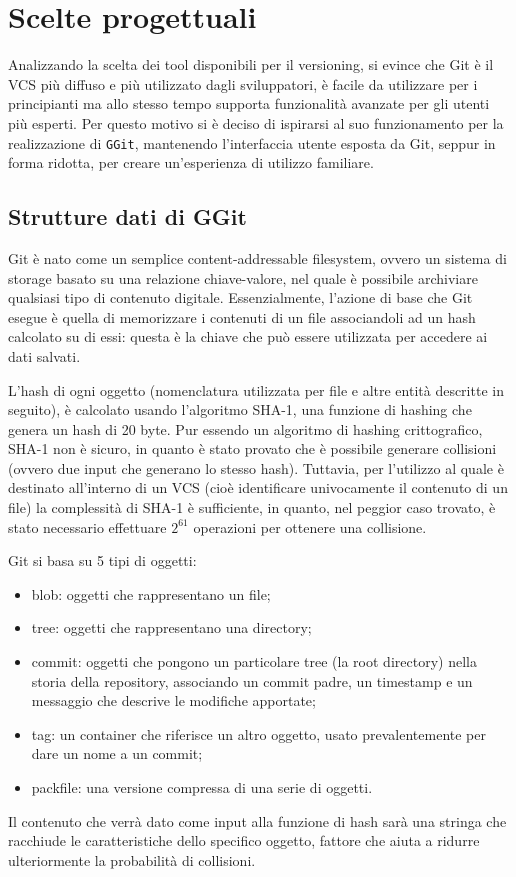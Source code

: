 \chapter{Scelte progettuali}
\label{chap:scelte_progettuali}
Analizzando la scelta dei tool disponibili per il versioning, si evince che Git è il VCS più diffuso e più utilizzato\cite{gitmostused} dagli sviluppatori, è facile da utilizzare per i principianti ma allo stesso tempo supporta funzionalità avanzate per gli utenti più esperti. Per questo motivo si è deciso di ispirarsi al suo funzionamento per la realizzazione di \texttt{GGit}, mantenendo l'interfaccia utente esposta da Git, seppur in forma ridotta, per creare un'esperienza di utilizzo familiare.
\section{Strutture dati di GGit}
\label{sec:strutture_dati}
Git è nato come un semplice content-addressable filesystem, ovvero un sistema di storage basato su una relazione chiave-valore, nel quale è possibile archiviare qualsiasi tipo di contenuto digitale. Essenzialmente, l'azione di base che Git esegue è quella di memorizzare i contenuti di un file associandoli ad un hash calcolato su di essi: questa è la chiave che può essere utilizzata per accedere ai dati salvati.

L'hash di ogni oggetto (nomenclatura utilizzata per file e altre entità descritte in seguito), è calcolato usando l'algoritmo SHA-1, una funzione di hashing che genera un hash di 20 byte.
Pur essendo un algoritmo di hashing crittografico, SHA-1 non è sicuro, in quanto è stato provato che è possibile generare collisioni\cite{sha1collision} (ovvero due input che generano lo stesso hash).
Tuttavia, per l'utilizzo al quale è destinato all'interno di un VCS (cioè identificare univocamente il contenuto di un file) la complessità di SHA-1 è sufficiente, in quanto, nel peggior caso trovato, è stato necessario effettuare $2^{61}$ operazioni per ottenere una collisione\cite{collisionprob}.

Git si basa su 5 tipi di oggetti:
\begin{itemize}
    \item blob: oggetti che rappresentano un file;
    \item tree: oggetti che rappresentano una directory;
    \item commit: oggetti che pongono un particolare tree (la root directory) nella storia della repository, associando un commit padre, un timestamp e un messaggio che descrive le modifiche apportate;
    \item tag: un container che riferisce un altro oggetto, usato prevalentemente per dare un nome a un commit;
    \item packfile: una versione compressa di una serie di oggetti.
\end{itemize}
Il contenuto che verrà dato come input alla funzione di hash sarà una stringa che racchiude le caratteristiche dello specifico oggetto, fattore che aiuta a ridurre ulteriormente la probabilità di collisioni.


